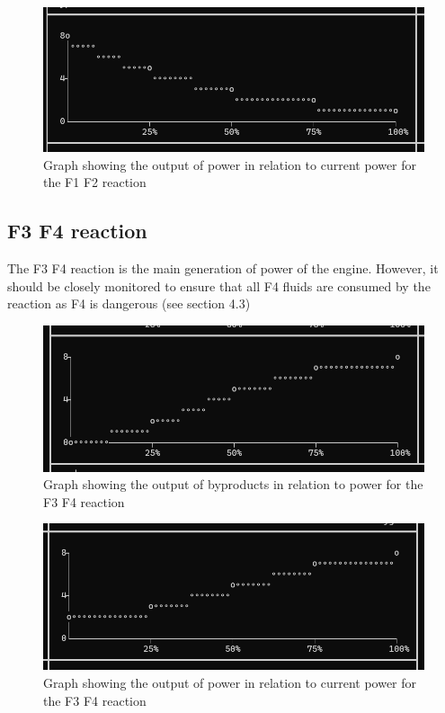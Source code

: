 \documentclass[12pt]{article}
\begin{document}
\begin{figure}[!htb]
    \center\includegraphics[width=\linewidth]{images/f1f2_power.png}
    \caption{Graph showing the output of power in relation to current power for the F1 F2 reaction}
\end{figure}

\newpage
\subsection{F3 F4 reaction}
The F3 F4 reaction is the main generation of power of the engine. However, it should be closely monitored to ensure that all F4 fluids are consumed by the reaction as F4 is dangerous (see section 4.3)

\begin{figure}[!htb]
    \center\includegraphics[width=\linewidth]{images/f1f2_f4.png}
    \caption{Graph showing the output of byproducts in relation to power for the F3 F4 reaction}
\end{figure}

\begin{figure}[!htb]
    \center\includegraphics[width=\linewidth]{images/f3f4_power.png}
    \caption{Graph showing the output of power in relation to current power for the F3 F4 reaction}
\end{figure}
\end{document}
